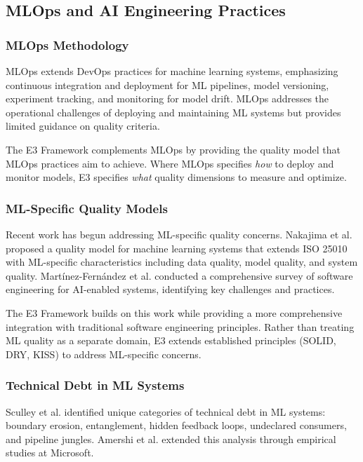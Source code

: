 \subsection{MLOps and AI Engineering Practices}

\subsubsection{MLOps Methodology}

MLOps \cite{sridhar2022mlops} extends DevOps practices for machine learning systems, emphasizing continuous integration and deployment for ML pipelines, model versioning, experiment tracking, and monitoring for model drift. MLOps addresses the operational challenges of deploying and maintaining ML systems but provides limited guidance on quality criteria.

The E3 Framework complements MLOps by providing the quality model that MLOps practices aim to achieve. Where MLOps specifies \emph{how} to deploy and monitor models, E3 specifies \emph{what} quality dimensions to measure and optimize.

\subsubsection{ML-Specific Quality Models}

Recent work has begun addressing ML-specific quality concerns. Nakajima et al. \cite{nakajima2022quality} proposed a quality model for machine learning systems that extends ISO 25010 with ML-specific characteristics including data quality, model quality, and system quality. Martínez-Fernández et al. \cite{martinez2022software} conducted a comprehensive survey of software engineering for AI-enabled systems, identifying key challenges and practices.

The E3 Framework builds on this work while providing a more comprehensive integration with traditional software engineering principles. Rather than treating ML quality as a separate domain, E3 extends established principles (SOLID, DRY, KISS) to address ML-specific concerns.

\subsubsection{Technical Debt in ML Systems}

Sculley et al. \cite{sculley2015hidden} identified unique categories of technical debt in ML systems: boundary erosion, entanglement, hidden feedback loops, undeclared consumers, and pipeline jungles. Amershi et al. \cite{amershi2019software} extended this analysis through empirical studies at Microsoft.

